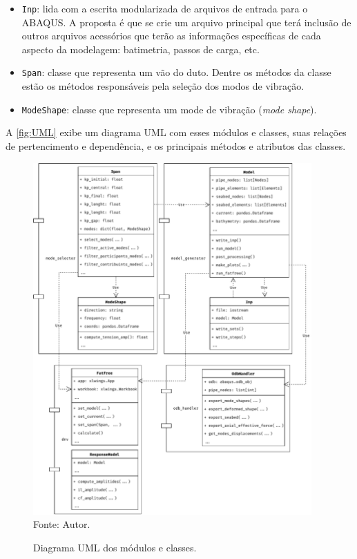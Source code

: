 \begin{itemize}
    \item \texttt{Inp}: lida com a escrita modularizada de arquivos de entrada  para o ABAQUS. A proposta é que se crie um arquivo principal que terá inclusão de outros arquivos acessórios que terão as informações específicas de cada aspecto da modelagem: batimetria, passos de carga, etc.
    
    \item \texttt{Span}: classe que representa um vão do duto. Dentre os métodos da classe estão os métodos responsáveis pela seleção dos modos de vibração.
    
    \item \texttt{ModeShape}: classe que representa um mode de vibração (\textit{mode shape}).
\end{itemize}

A \autoref{fig:UML} exibe um diagrama UML com esses módulos e classes, suas relações de pertencimento e dependência, e os principais métodos e atributos das classes.

\begin{figure}[!ht]
    \centering
    \caption{Diagrama UML dos módulos e classes.}\label{fig:UML}
    \includegraphics[width=0.95\textwidth]{imagens/UML}
    \\Fonte: Autor.
\end{figure}
